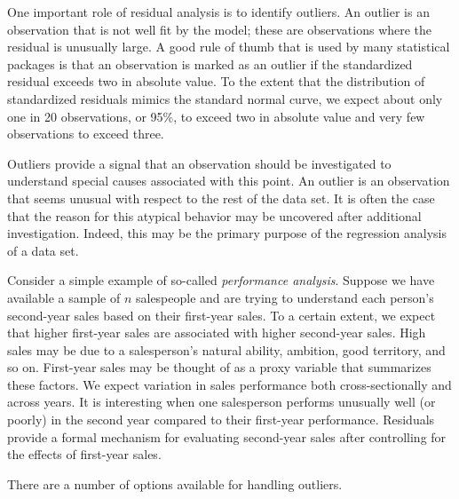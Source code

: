 
One important role of residual analysis is to identify outliers. An
outlier is an observation that is not well fit by the model; these
are observations where the residual is unusually large. A good rule
of thumb that is used by many statistical packages is that an
observation is marked as an outlier if the standardized residual
exceeds two in absolute value. To the extent that the distribution
of standardized residuals mimics the standard normal curve, we
expect about only one in 20 observations, or 95\%, to exceed two in
absolute value and very few observations to exceed three.

Outliers provide a signal that an observation should be investigated
to understand special causes associated with this point. An outlier
is an observation that seems unusual with respect to the rest of the
data set. It is often the case that the reason for this atypical
behavior may be uncovered after additional investigation. Indeed,
this may be the primary purpose of the regression analysis of a data
set.

Consider a simple example of so-called \textit{performance
analysis}. Suppose we have available a sample of $n$ salespeople and
are trying to understand each person's second-year sales based on
their first-year sales. To a certain extent, we expect that higher
first-year sales are associated with higher second-year sales. High
sales may be due to a salesperson's natural ability, ambition, good
territory, and so on. First-year sales may be thought of as a proxy
variable that summarizes these factors. We expect variation in sales
performance both cross-sectionally and across years. It is
interesting when one salesperson performs unusually well (or poorly)
in the second year compared to their first-year performance.
Residuals provide a formal mechanism for evaluating second-year
sales after controlling for the effects of first-year sales.

There are a number of options available for handling outliers.

\bigskip

\boxedjed

